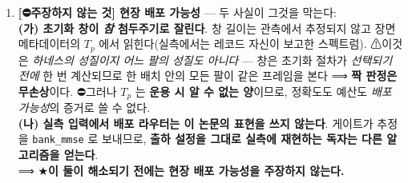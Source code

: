 \documentclass[11pt]{report}
\numberwithin{equation}{chapter}
\numberwithin{figure}{chapter}
\numberwithin{table}{chapter}
\begin{document}
\begin{enumerate}
{        앵커로 쓸 수 없다} --- 파일 해시의 동결은 \emph{파일의 동일성}을 보장할 뿐
        \emph{자료의 정합성}을 보장하지 않으므로(서로 모순인 두 파일이 나란히 동결돼
        있어도 해시는 둘 다 맞는다), 앵커 게이트는 값을 비교하기 \emph{전에} 양쪽 장면
        상수의 일치를 검사해야 한다. \textbf{②~앵커 성립성은 한 레코드로 검증하지 않는다}
        --- 선행 배치가 앵커 성립을 눈으로 확인한 레코드가 하필 \emph{그 결함이 항등적으로
        $0$인} 레코드였다(검사기가 아니라 \textbf{검사 대상의 선택}이 항진이었다).
        ⚠\textbf{③~그리고 이 절차의 한계도 같은 날 드러났다} --- 판정 코드를 결과 이후에
        고친 배치에서 검사기는 \emph{``판정 규칙이 결과를 보고 이동했을 가능성을 배제할 수
        없다''}고 계속 표시하고, 본 논문은 그 표시를 \textbf{끄지 않고 켠 채로 둔다}
        (\S\ref{sec:init-bank} 의 용량 인용 지위 문단). \textbf{검사기의 경고와 그 문단의
        회계는 모순이 아니라 같은 말이다.}

  \item \textbf{[⛔주장하지 않는 것] 현장 배포 가능성} --- 두 사실이 그것을 막는다: \\
        \textbf{(가) 초기화 창이 \emph{참} 첨두주기로 잘린다}. 창 길이는 관측에서 추정되지 않고
        장면 메타데이터의 $T_p$ 에서 읽힌다(실측에서는 레코드 자신이 보고한 스펙트럼).
        ⚠이것은 \emph{하네스의 성질이지 어느 팔의 성질도 아니다} --- 창은 초기화 절차가
        \emph{선택되기 전에} 한 번 계산되므로 한 배치 안의 모든 팔이 같은 프레임을 본다
        ⟹ \textbf{짝 판정은 무손상}이다. ⛔그러나 $T_p$ 는 \textbf{운용 시 알 수 없는 양}이므로,
        정확도도 예산도 \emph{배포 가능성}의 증거로 쓸 수 없다. \\
        \textbf{(나) 실측 입력에서 배포 라우터는 이 논문의 표현을 쓰지 않는다}. 게이트가
        추정을 \texttt{bank\_mmse} 로 보내므로, \textbf{출하 설정을 그대로 실측에 재현하는
        독자는 다른 알고리즘을 얻는다}. \\
        ⟹ ★\textbf{이 둘이 해소되기 전에는 현장 배포 가능성을 주장하지 않는다.} \\


\end{enumerate}
\end{document}
